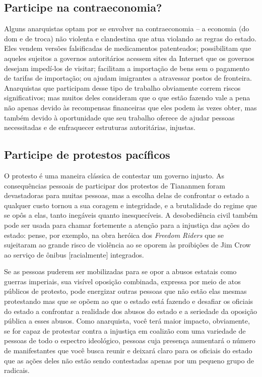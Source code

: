 \subsection*{Participe na contraeconomia?}

Alguns anarquistas optam por se envolver na contraeconomia -- a economia (do dom e de troca) não violenta e clandestina que atua violando as regras do estado. Eles vendem versões falsificadas de medicamentos patenteados; possibilitam que aqueles sujeitos a governos autoritários acessem sites da Internet que os governos desejam impedí-los de visitar; facilitam a importação de bens sem o pagamento de tarifas de importação; ou ajudam imigrantes a atravessar postos de fronteira. Anarquistas que participam desse tipo de trabalho obviamente correm riscos significativos; mas muitos deles consideram que o que estão fazendo vale a pena não apenas devido às recompensas financeiras que eles podem às vezes obter, mas também devido à oportunidade que seu trabalho oferece de ajudar pessoas necessitadas e de enfraquecer estruturas autoritárias, injustas.

\subsection*{Participe de protestos pacíficos}

O protesto é uma maneira clássica de contestar um governo injusto. As consequências pessoais de participar dos protestos de Tiananmen foram devastadoras para muitas pessoas, mas a escolha delas de confrontar o estado a qualquer custo tornou a sua coragem e integridade, e a brutalidade do regime que se opôs a elas, tanto inegáveis quanto inesquecíveis. A desobediência civil também pode ser usada para chamar fortemente a atenção para a injustiça das ações do estado: pense, por exemplo, na obra heróica dos \emph{Freedom Riders} que se sujeitaram ao grande risco de violência ao se oporem às proibições de Jim Crow ao serviço de ônibus [racialmente] integrados.

Se as pessoas puderem ser mobilizadas para se opor a abusos estatais como guerras imperiais, sua visível oposição combinada, expressa por meio de atos públicos de protesto, pode energizar outras pessoas que não estão elas mesmas protestando mas que se opõem ao que o estado está fazendo e desafiar os oficiais do estado a confrontar a realidade dos abusos do estado e a seriedade da oposição pública a esses abusos. Como anarquista, você terá maior impacto, obviamente, se for capaz de protestar contra a injustiça em coalizão com uma variedade de pessoas de todo o espectro ideológico, pessoas cuja presença aumentará o número de manifestantes que você busca reunir e deixará claro para os oficiais do estado que as ações deles não estão sendo contestadas apenas por um pequeno grupo de radicais.

